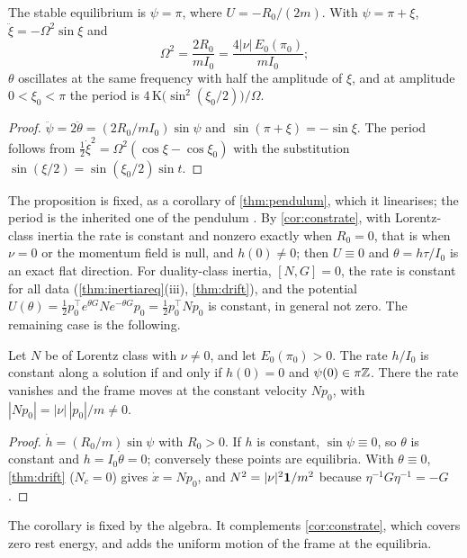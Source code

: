 \begin{proposition}
\label{cl:omega}
The stable equilibrium is $\psi=\pi$, where $U=-R_0/(2m)$. With $\psi=\pi+\xi$, $\ddot\xi=-\Omega^2\sin\xi$ and
\[
\Omega^2=\frac{2R_0}{mI_0}=\frac{4|\nu|\,E_0(\pi_0)}{mI_0} ;
\]
$\theta$ oscillates at the same frequency with half the amplitude of $\xi$, and at amplitude $0<\xi_0<\pi$ the period is
$4\,\mathrm K\bigl(\sin^2(\xi_0/2)\bigr)/\Omega$.
\end{proposition}

\begin{proof}
$\ddot\psi=2\ddot\theta=(2R_0/mI_0)\sin\psi$ and $\sin(\pi+\xi)=-\sin\xi$. The period follows from $\tfrac12\dot\xi^2=\Omega^2(\cos\xi-\cos\xi_0)$ with
the substitution $\sin(\xi/2)=\sin(\xi_0/2)\sin t$.
\end{proof}

The proposition is fixed, as a corollary of \cref{thm:pendulum}, which it linearises; the period is the inherited one of the pendulum
\cite{DLMF}. By \cref{cor:constrate}, with Lorentz-class inertia the rate is constant and nonzero exactly when $R_0=0$, that is when $\nu=0$ or
the momentum field is null, and $h(0)\neq0$; then $U\equiv0$ and $\theta=h\tau/I_0$ is an exact flat direction. For duality-class inertia, $[N,G]=0$, the rate is constant for all data
(\cref{thm:inertiareq}(iii), \cref{thm:drift}), and the potential $U(\theta)=\tfrac12p_0^{\!\top}e^{\theta G}Ne^{-\theta G}p_0=\tfrac12p_0^{\!\top}Np_0$ is
constant, in general not zero. The remaining case is the following.

\begin{corollary}
\label{cl:flat}
Let $N$ be of Lorentz class with $\nu\neq0$, and let $E_0(\pi_0)>0$. The rate $h/I_0$ is constant along a solution if and only if $h(0)=0$ and
$\psi(0)\in\pi\mathbb{Z}$. There the rate vanishes and the frame moves at the constant velocity $Np_0$, with $|Np_0|=|\nu|\,|p_0|/m\neq0$.
\end{corollary}

\begin{proof}
$\dot h=(R_0/m)\sin\psi$ with $R_0>0$. If $h$ is constant, $\sin\psi\equiv0$, so $\theta$ is constant and $h=I_0\dot\theta=0$; conversely these points are
equilibria. With $\theta\equiv0$, \cref{thm:drift} ($N_c=0$) gives $\dot x=Np_0$, and $N^2=|\nu|^2\mathbf 1/m^2$ because $\eta^{-1}G\eta^{-1}=-G$.
\end{proof}

The corollary is fixed by the algebra. It complements \cref{cor:constrate}, which covers zero rest energy, and adds the uniform motion of the frame
at the equilibria.


